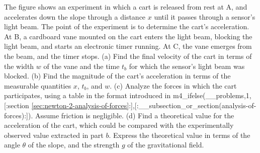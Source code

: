 The figure shows an experiment in which a cart is
released from rest at A, and accelerates down the slope
through a distance $x$ until it passes through a sensor's
light beam. The point of the experiment is to determine the
cart's acceleration. At B, a cardboard vane mounted on the
cart enters the light beam, blocking the light beam, and
starts an electronic timer running. At C, the vane emerges
from the beam, and the timer stops.\hwendpart
 (a) Find the final
velocity of the cart in terms of the width $w$ of the vane
and the time $t_b$ for which the sensor's light beam was
blocked.\answercheck\hwendpart
 (b) Find the magnitude of the cart's acceleration
in terms of the measurable quantities $x$, $t_b$, and $w$.\answercheck\hwendpart
(c) Analyze the forces in which the cart participates, using
a table in the format introduced in m4_ifelse(__problems,1,[:section \ref{sec:newton-2-analysis-of-forces}:],[:__subsection_or_section(analysis-of-forces):]). Assume
friction is negligible.\hwendpart
(d) Find a theoretical value for the
acceleration of the cart, which could be compared with the
experimentally observed value extracted in part $b$. Express
the theoretical value in terms of the angle $\theta $ of the
slope, and the strength $g$ of the gravitational field.\answercheck
